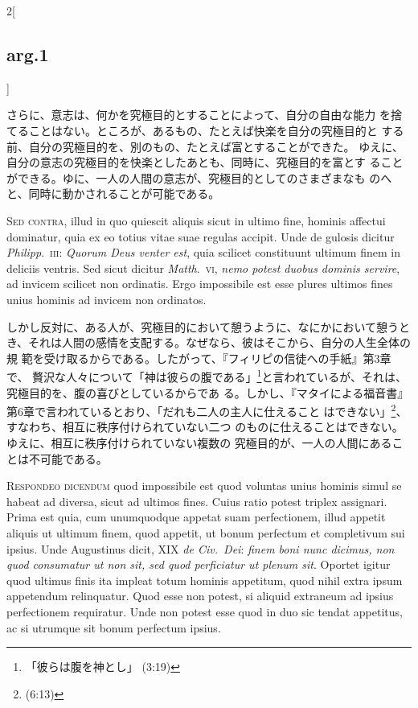 \documentclass[paper=a4paper,fontsize=10pt,jafontsize=9pt,titlepage]{jlreq}
\begin{document}
\begin{paracol}{2}[\subsection{arg.1}]
\switchcolumn

さらに、意志は、何かを究極目的とすることによって、自分の自由な能力
 を捨てることはない。ところが、あるもの、たとえば快楽を自分の究極目的と
 する前、自分の究極目的を、別のもの、たとえば富とすることができた。
ゆえに、自分の意志の究極目的を快楽としたあとも、同時に、究極目的を富とす
 ることができる。ゆに、一人の人間の意志が、究極目的としてのさまざまなも
 のへと、同時に動かされることが可能である。

\switchcolumn*[\subsection{s.c.}]

{\scshape Sed contra}, illud in quo quiescit
aliquis sicut in ultimo fine, hominis affectui dominatur, quia ex eo
totius vitae suae regulas accipit. Unde de gulosis dicitur {\itshape Philipp}.~{\scshape iii}:
{\itshape Quorum Deus venter est}, quia scilicet constituunt ultimum finem in
deliciis ventris. Sed sicut dicitur {\itshape Matth}.~{\scshape vi}, {\itshape nemo potest duobus
dominis servire}, ad invicem scilicet non ordinatis. Ergo impossibile est
esse plures ultimos fines unius hominis ad invicem non ordinatos.

\switchcolumn

しかし反対に、ある人が、究極目的において憩うように、なにかにおいて憩うと
 き、それは人間の感情を支配する。なぜなら、彼はそこから、自分の人生全体の規
 範を受け取るからである。したがって、『フィリピの信徒への手紙』第3章で、
 贅沢な人々について「神は彼らの腹である」\footnote{「彼らは腹を神とし」
 (3:19)}と言われているが、それは、究極目的を、腹の喜びとしているからであ
 る。しかし、『マタイによる福音書』第6章で言われているとおり、「だれも二人の主人に仕えること
 はできない」\footnote{(6:13)}、すなわち、相互に秩序付けられていない二つ
 のものに仕えることはできない。ゆえに、相互に秩序付けられていない複数の
 究極目的が、一人の人間にあることは不可能である。


{\scshape Respondeo dicendum} quod impossibile est
quod voluntas unius hominis simul se habeat ad diversa, sicut ad ultimos
fines. Cuius ratio potest triplex assignari. Prima est quia, cum
unumquodque appetat suam perfectionem, illud appetit aliquis ut ultimum
finem, quod appetit, ut bonum perfectum et completivum sui ipsius. Unde
Augustinus dicit, XIX {\itshape de Civ.~Dei}: {\itshape finem boni nunc dicimus, non quod
consumatur ut non sit, sed quod perficiatur ut plenum sit}. Oportet
igitur quod ultimus finis ita impleat totum hominis appetitum, quod
nihil extra ipsum appetendum relinquatur. Quod esse non potest, si
aliquid extraneum ad ipsius perfectionem requiratur. Unde non potest
esse quod in duo sic tendat appetitus, ac si utrumque sit bonum
perfectum ipsius.


\end{paracol}
\end{document}
